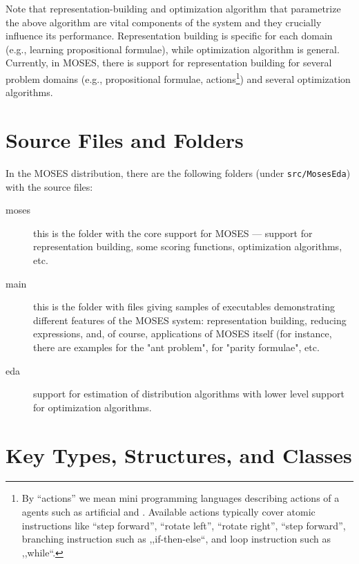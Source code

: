 \documentclass{article}
\begin{document}
Note that representation-building and optimization algorithm that parametrize
the above algorithm are vital components of the system and they crucially 
influence its performance.
Representation building is specific for each domain (e.g., learning 
propositional formulae), while optimization algorithm is general. 
Currently, in MOSES, there is support for representation building 
for several problem domains (e.g., propositional formulae, 
actions\footnote{By ``actions'' we mean mini programming languages
describing actions of a agents such as artificial and \cite{6}. Available
actions typically cover atomic instructions like ``step forward'',
``rotate left'', ``rotate right'', ``step forward'', 
branching instruction such as ,,if-then-else``,
and loop instruction such as ,,while``.}) 
and several optimization algorithms. 


\section{Source Files and Folders}

In the MOSES distribution, there are the following folders (under \verb|src/MosesEda|) with the source files:

\begin{description}
\item[moses] this is the folder with the core support for MOSES --- 
support for representation building, some scoring functions, optimization
algorithms, etc. 

\item[main] this is the folder with files giving samples of executables 
demonstrating different features of the MOSES system: representation building, 
reducing expressions, and, of course, applications of MOSES itself (for 
instance, there are examples for the "ant problem", for "parity formulae", etc.

\item[eda] support for estimation of distribution algorithms with lower
level support for optimization algorithms. 
\end{description}




\section{Key Types, Structures, and Classes}
\end{document}
